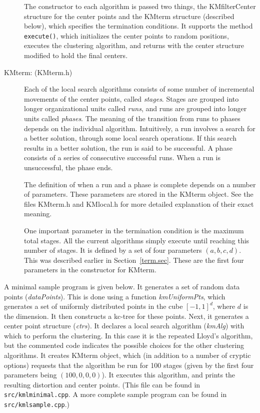 \documentclass[11pt]{article}		%
\begin{document}
\begin{description}
	The constructor to each algorithm is passed two things, the
	KMfilterCenter structure for the center points and the KMterm
	structure (described below), which specifies the termination
	conditions.  It supports the method \texttt{execute()}, which
	initializes the center points to random positions, executes the
	clustering algorithm, and returns with the center structure
	modified to hold the final centers.
\item[KMterm: (KMterm.h)] Each of the local search algorithms consists
	of some number of incremental movements of the center points,
	called \emph{stages}.  Stages are grouped into longer
	organizational units called \emph{runs}, and runs are grouped
	into longer units called \emph{phases}.  The meaning of the
	transition from runs to phases depends on the individual
	algorithm.  Intuitively, a run involves a search for a better
	solution, through some local search operations.  If this search
	results in a better solution, the run is said to be successful.
	A phase consists of a series of consecutive successful runs.
	When a run is unsuccessful, the phase ends.

	The definition of when a run and a phase is complete depends on
	a number of parameters.  These parameters are stored in the
	KMterm object.  See the files KMterm.h and KMlocal.h for more
	detailed explanation of their exact meaning.

	One important parameter in the termination condition is the
	maximum total stages.  All the current algorithms simply execute
	until reaching this number of stages.  It is defined by a set of
	four parameters $(a,b,c,d)$.  This was described earlier in 
	Section~\ref{term.sec}.  These are the first four parameters
	in the constructor for KMterm.
\end{description}

A minimal sample program is given below.  It generates a set of random
data points (\emph{dataPoints}).  This is done using a function
\emph{kmUniformPts}, which generates a set of uniformly distributed
points in the cube $[-1,1]^d$, where $d$ is the dimension.  It then
constructs a kc-tree for these points.  Next, it generates a center
point structure (\emph{ctrs}).  It declares a local search algorithm
(\emph{kmAlg}) with which to perform the clustering.  In this case it is
the repeated Lloyd's algorithm, but the commented code indicates the
possible choices for the other clustering algorithms.  It creates KMterm
object, which (in addition to a number of cryptic options) requests that
the algorithm be run for 100 stages (given by the first four parameters
being $(100, 0, 0, 0)$).  It executes this algorithm, and prints the
resulting distortion and center points. (This file can be found in
\texttt{src/kmlminimal.cpp}. A more complete sample program can be found
in \texttt{src/kmlsample.cpp}.)
\end{document}
